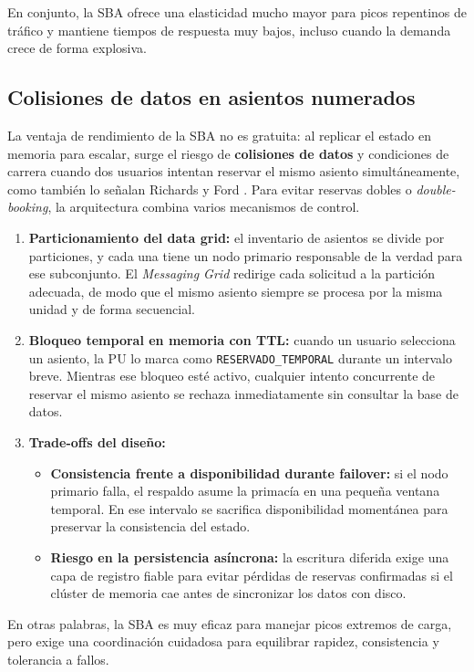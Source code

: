 En conjunto, la SBA ofrece una elasticidad mucho mayor para picos repentinos de tráfico y mantiene tiempos de respuesta muy bajos, incluso cuando la demanda crece de forma explosiva.

\subsection{Colisiones de datos en asientos numerados}
La ventaja de rendimiento de la SBA no es gratuita: al replicar el estado en memoria para escalar, surge el riesgo de \textbf{colisiones de datos} y condiciones de carrera cuando dos usuarios intentan reservar el mismo asiento simultáneamente, como también lo señalan Richards y Ford \parencite{richards2020fundamentals}. Para evitar reservas dobles o \emph{double-booking}, la arquitectura combina varios mecanismos de control.

\begin{enumerate}
    \item \textbf{Particionamiento del data grid:} el inventario de asientos se divide por particiones, y cada una tiene un nodo primario responsable de la verdad para ese subconjunto. El \emph{Messaging Grid} redirige cada solicitud a la partición adecuada, de modo que el mismo asiento siempre se procesa por la misma unidad y de forma secuencial.
    \item \textbf{Bloqueo temporal en memoria con TTL:} cuando un usuario selecciona un asiento, la PU lo marca como \texttt{RESERVADO\_TEMPORAL} durante un intervalo breve. Mientras ese bloqueo esté activo, cualquier intento concurrente de reservar el mismo asiento se rechaza inmediatamente sin consultar la base de datos.
    \item \textbf{Trade-offs del diseño:}
        \begin{itemize}
            \item \textbf{Consistencia frente a disponibilidad durante failover:} si el nodo primario falla, el respaldo asume la primacía en una pequeña ventana temporal. En ese intervalo se sacrifica disponibilidad momentánea para preservar la consistencia del estado.
            \item \textbf{Riesgo en la persistencia asíncrona:} la escritura diferida exige una capa de registro fiable para evitar pérdidas de reservas confirmadas si el clúster de memoria cae antes de sincronizar los datos con disco.
        \end{itemize}
\end{enumerate}

En otras palabras, la SBA es muy eficaz para manejar picos extremos de carga, pero exige una coordinación cuidadosa para equilibrar rapidez, consistencia y tolerancia a fallos.
